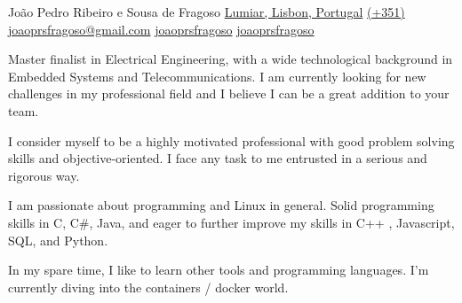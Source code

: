 \documentclass[12pt, a4paper]{cv}
\begin{document}

\begin{minipage}{0.35\linewidth}
	\photo{1.5cm}
\end{minipage}\hfil
\begin{minipage}{0.55\linewidth}
	\begin{minipage}{0.1\linewidth}
		\begin{center}
			\user
			\location
			\mobile
			\mail
			\linkedin
			\skype
		\end{center}
	\end{minipage}\hfil
	\begin{minipage}{0.9\linewidth}
		João Pedro Ribeiro e Sousa de Fragoso \newline
		\href{https://www.google.com/maps/place/Lumiar,+Lisbon,+Portugal}{Lumiar, Lisbon, Portugal} \newline
		\href{callto:+351924429083}{(+351) } \newline
		\href{mailto:joaoprsfragoso@gmail.com}{joaoprsfragoso@gmail.com} \newline
		\href{https://www.linkedin.com/in/joaoprsfragoso/}{joaoprsfragoso} \newline
		\href{skype://joaoprsfragoso}{joaoprsfragoso}
	\end{minipage}
\end{minipage}
\vfill
{}%
\aboutme
{
	Master finalist in Electrical Engineering, with a wide technological background in Embedded Systems and Telecommunications. I am currently looking for new challenges in my professional field and I believe I can be a great addition to your team.

	I consider myself to be a highly motivated professional with good problem solving skills and objective-oriented. I face any task to me entrusted in a serious and rigorous way.

	I am passionate about programming and Linux in general. Solid programming skills in C, C\#, Java, and eager to further improve my skills in C++ , Javascript, SQL, and Python. 

	In my spare time, I like to learn other tools and programming languages. I'm currently diving into the containers / docker world.
}
\vspace{4mm}

\begin{minipage}{0.8\linewidth}
	 \newline
\end{minipage}\hfil
\begin{minipage}{0.2\linewidth}
	\begin{flushright}
	\end{flushright}
\end{minipage}
\end{document}
